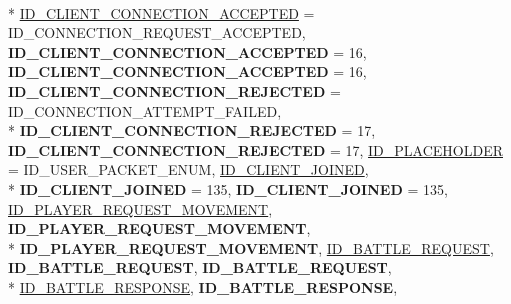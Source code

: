 \begin{DoxyCompactItemize}
\\*
\hyperlink{namespace_champ_net_plugin_a2ade5cfa7cf6c25ab7236c6b54a57821a0295101371b4a70a1c007a4f6e206e1d}{I\-D\-\_\-\-C\-L\-I\-E\-N\-T\-\_\-\-C\-O\-N\-N\-E\-C\-T\-I\-O\-N\-\_\-\-A\-C\-C\-E\-P\-T\-E\-D} = I\-D\-\_\-\-C\-O\-N\-N\-E\-C\-T\-I\-O\-N\-\_\-\-R\-E\-Q\-U\-E\-S\-T\-\_\-\-A\-C\-C\-E\-P\-T\-E\-D, 
{\bfseries I\-D\-\_\-\-C\-L\-I\-E\-N\-T\-\_\-\-C\-O\-N\-N\-E\-C\-T\-I\-O\-N\-\_\-\-A\-C\-C\-E\-P\-T\-E\-D} = 16, 
{\bfseries I\-D\-\_\-\-C\-L\-I\-E\-N\-T\-\_\-\-C\-O\-N\-N\-E\-C\-T\-I\-O\-N\-\_\-\-A\-C\-C\-E\-P\-T\-E\-D} = 16, 
{\bfseries I\-D\-\_\-\-C\-L\-I\-E\-N\-T\-\_\-\-C\-O\-N\-N\-E\-C\-T\-I\-O\-N\-\_\-\-R\-E\-J\-E\-C\-T\-E\-D} = I\-D\-\_\-\-C\-O\-N\-N\-E\-C\-T\-I\-O\-N\-\_\-\-A\-T\-T\-E\-M\-P\-T\-\_\-\-F\-A\-I\-L\-E\-D, 
\\*
{\bfseries I\-D\-\_\-\-C\-L\-I\-E\-N\-T\-\_\-\-C\-O\-N\-N\-E\-C\-T\-I\-O\-N\-\_\-\-R\-E\-J\-E\-C\-T\-E\-D} = 17, 
{\bfseries I\-D\-\_\-\-C\-L\-I\-E\-N\-T\-\_\-\-C\-O\-N\-N\-E\-C\-T\-I\-O\-N\-\_\-\-R\-E\-J\-E\-C\-T\-E\-D} = 17, 
\hyperlink{namespace_champ_net_plugin_a2ade5cfa7cf6c25ab7236c6b54a57821a6acf78ef40fd50b2e823237ea828fc1b}{I\-D\-\_\-\-P\-L\-A\-C\-E\-H\-O\-L\-D\-E\-R} = I\-D\-\_\-\-U\-S\-E\-R\-\_\-\-P\-A\-C\-K\-E\-T\-\_\-\-E\-N\-U\-M, 
\hyperlink{namespace_champ_net_plugin_a2ade5cfa7cf6c25ab7236c6b54a57821aeb7ac0bb4cb955cc0b7a3bebc9f14774}{I\-D\-\_\-\-C\-L\-I\-E\-N\-T\-\_\-\-J\-O\-I\-N\-E\-D}, 
\\*
{\bfseries I\-D\-\_\-\-C\-L\-I\-E\-N\-T\-\_\-\-J\-O\-I\-N\-E\-D} = 135, 
{\bfseries I\-D\-\_\-\-C\-L\-I\-E\-N\-T\-\_\-\-J\-O\-I\-N\-E\-D} = 135, 
\hyperlink{namespace_champ_net_plugin_a2ade5cfa7cf6c25ab7236c6b54a57821abaa5b813ea0118cdccbb8f80d461fea8}{I\-D\-\_\-\-P\-L\-A\-Y\-E\-R\-\_\-\-R\-E\-Q\-U\-E\-S\-T\-\_\-\-M\-O\-V\-E\-M\-E\-N\-T}, 
{\bfseries I\-D\-\_\-\-P\-L\-A\-Y\-E\-R\-\_\-\-R\-E\-Q\-U\-E\-S\-T\-\_\-\-M\-O\-V\-E\-M\-E\-N\-T}, 
\\*
{\bfseries I\-D\-\_\-\-P\-L\-A\-Y\-E\-R\-\_\-\-R\-E\-Q\-U\-E\-S\-T\-\_\-\-M\-O\-V\-E\-M\-E\-N\-T}, 
\hyperlink{namespace_champ_net_plugin_a2ade5cfa7cf6c25ab7236c6b54a57821a1099c58a5b9ad43616e67c5865ce539a}{I\-D\-\_\-\-B\-A\-T\-T\-L\-E\-\_\-\-R\-E\-Q\-U\-E\-S\-T}, 
{\bfseries I\-D\-\_\-\-B\-A\-T\-T\-L\-E\-\_\-\-R\-E\-Q\-U\-E\-S\-T}, 
{\bfseries I\-D\-\_\-\-B\-A\-T\-T\-L\-E\-\_\-\-R\-E\-Q\-U\-E\-S\-T}, 
\\*
\hyperlink{namespace_champ_net_plugin_a2ade5cfa7cf6c25ab7236c6b54a57821a4d61a30352b41b284f20eeb6d46d0b18}{I\-D\-\_\-\-B\-A\-T\-T\-L\-E\-\_\-\-R\-E\-S\-P\-O\-N\-S\-E}, 
{\bfseries I\-D\-\_\-\-B\-A\-T\-T\-L\-E\-\_\-\-R\-E\-S\-P\-O\-N\-S\-E}, 

\end{DoxyCompactItemize}
